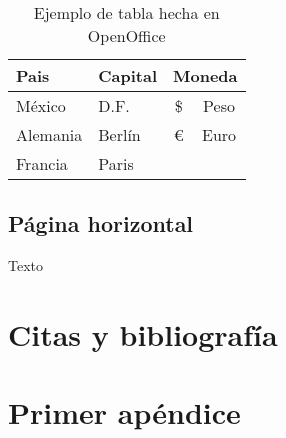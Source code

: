 \documentclass[12pt, a4paper,twoside]{article} %
\begin{document}
\begin{table}[htbp]
\begin{center}
\begin{tabular}{|l|l|c|c|}
\hline
\textbf{Pais} & \textbf{Capital} & \multicolumn{ 2}{c|}{\textbf{Moneda}} \\ \hline
México & D.F. & \$ & Peso \\ \hline
Alemania & Berlín & \multicolumn{ 1}{c|}{€} & \multicolumn{ 1}{c|}{Euro} \\ \cline{ 1- 2}
Francia & Paris & \multicolumn{ 1}{c|}{} & \multicolumn{ 1}{c|}{} \\ \hline
\end{tabular}
\end{center}
\caption{Ejemplo de tabla hecha en OpenOffice}
\label{tab:openoffice}
\end{table}

\begin{landscape}
\section{Página horizontal}
Texto
\end{landscape}

\section{Citas y bibliografía}
\clearpage



\clearpage
\appendix
\noappendicestocpagenum %
\addappheadtotoc %
\appendixpage %
\section{Primer apéndice}
\end{document}
